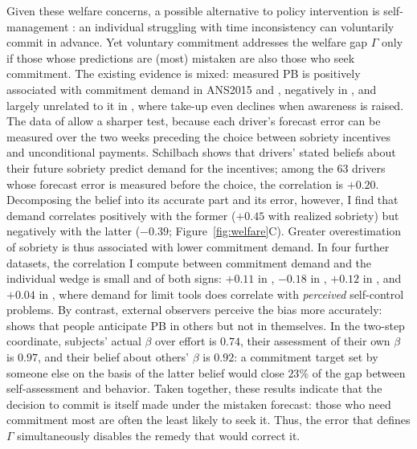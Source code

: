 \documentclass[11pt,a4paper]{article}
\theoremstyle{plain}
\theoremstyle{definition}
\begin{document}
Given these welfare concerns, a possible alternative to policy intervention is self-management \citep{kruegeluhl2023}: an individual struggling with time inconsistency can voluntarily commit in advance. Yet voluntary commitment addresses the welfare gap $\Gamma$ only if those whose predictions are (most) mistaken are also those who seek commitment. 
The existing evidence is mixed: measured PB is positively associated with commitment demand in ANS2015 and \citet{kaur2015}, negatively in \citet{sadoff2020}, and largely unrelated to it in \citet{carrera2022}, where take-up even declines when awareness is raised.
The data of \citet{schilbach2019} allow a sharper test, because each driver's forecast error can be measured over the two weeks preceding the choice between sobriety incentives and unconditional payments. 
Schilbach shows that drivers' stated beliefs about their future sobriety predict demand for the incentives; among the $63$ drivers whose forecast error is measured before the choice, the correlation is $+0.20$.
Decomposing the belief into its accurate part and its error, however, I find that demand correlates positively with the former ($+0.45$ with realized sobriety) but negatively with the latter ($-0.39$; Figure~\ref{fig:welfare}C). 
Greater overestimation of sobriety is thus associated with lower commitment demand. %
In four further datasets, the correlation I compute between commitment demand and the individual wedge is small and of both signs: $+0.11$ %
in \citet{carrera2022}, $-0.18$ in \citet{sadoff2020}, $+0.12$ in \citet{kaur2015}, and $+0.04$ in \citet{allcott2022}, where demand for limit tools does correlate with \emph{perceived} self-control problems.
By contrast, external observers perceive the bias more accurately: \citet{fedyk2024} shows that people anticipate PB in others but not in themselves. In the two-step coordinate, subjects' actual $\beta$ over effort is $0.74$, their assessment of their own $\beta$ is $0.97$, and their belief about others' $\beta$ is $0.92$: a commitment target set by someone else on the basis of the latter belief would close $23\%$ of the gap between self-assessment and behavior. 
Taken together, these results indicate that the decision to commit is itself made under the mistaken forecast: those who need commitment most are often the least likely to seek it. 
Thus, the %
error that defines $\Gamma$ simultaneously disables the %
remedy that would correct it.
\end{document}
